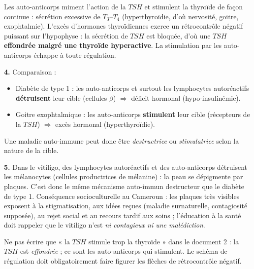 \documentclass[11pt]{article}
\newcommand{\cle}[1]{{\popxbold\color{popdark}#1}}
\begin{document}
\begin{corrige}
Les auto-anticorps miment l'action de la $TSH$ et stimulent la thyroïde de façon continue : sécrétion excessive de $T_3$--$T_4$ (hyperthyroïdie, d'où nervosité, goitre, exophtalmie). L'excès d'hormones thyroïdiennes exerce un rétrocontrôle négatif puissant sur l'hypophyse : la sécrétion de $TSH$ est bloquée, d'où une \textbf{$TSH$ effondrée malgré une thyroïde hyperactive}. La stimulation par les auto-anticorps échappe à toute régulation.

\textbf{4.} Comparaison :
\begin{itemize}
\item Diabète de type 1 : les auto-anticorps et surtout les lymphocytes autoréactifs \textbf{détruisent} leur cible (cellules $\beta$) $\Rightarrow$ déficit hormonal (hypo-insulinémie).
\item Goitre exophtalmique : les auto-anticorps \textbf{stimulent} leur cible (récepteurs de la $TSH$) $\Rightarrow$ excès hormonal (hyperthyroïdie).
\end{itemize}
Une maladie auto-immune peut donc être \emph{destructrice} ou \emph{stimulatrice} selon la nature de la cible.

\textbf{5.} Dans le \cle{vitiligo}, des lymphocytes autoréactifs et des auto-anticorps détruisent les \cle{mélanocytes} (cellules productrices de mélanine) : la peau se dépigmente par plaques. C'est donc le même mécanisme auto-immun destructeur que le diabète de type 1. Conséquence socioculturelle au Cameroun : les plaques très visibles exposent à la stigmatisation, aux idées reçues (maladie surnaturelle, contagiosité supposée), au rejet social et au recours tardif aux soins ; l'éducation à la santé doit rappeler que le vitiligo n'est \emph{ni contagieux ni une malédiction}.
\end{corrige}

\begin{attention}
Ne pas écrire que « la $TSH$ stimule trop la thyroïde » dans le document 2 : la $TSH$ est \emph{effondrée} ; ce sont les auto-anticorps qui stimulent. Le schéma de régulation doit obligatoirement faire figurer les flèches de rétrocontrôle négatif.
\end{attention}
\end{document}
